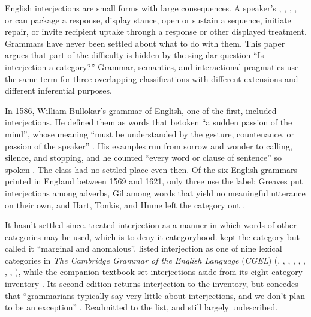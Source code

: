\documentclass[12pt]{article}
\begin{document}
English interjections are small forms with large consequences. A
speaker's , , , , or
 can package a response, display stance, open or sustain a
sequence, initiate repair, or invite recipient uptake through a response or
other displayed treatment. Grammars have never been
settled about what to do with them. This paper argues that part of the
difficulty is hidden by the singular question \enquote{Is interjection a
category?} Grammar, semantics, and interactional pragmatics use the same term
for three overlapping classifications with different extensions and
different inferential purposes.

In 1586, William Bullokar's grammar of English, one of the first,
included interjections. He defined them as words that betoken
\enquote{a sudden passion of the mind}, whose meaning \enquote{must be
understanded by the gesture, countenance, or passion of the speaker}
\citep[373]{bullokar1586}. His examples run from sorrow and wonder to
calling, silence, and stopping, and he counted
\enquote{every word or clause of sentence} so spoken
\citep[350]{bullokar1586}. The class had no settled place even then. Of
the six English grammars printed in England between 1569 and 1621, only
three use the label: Greaves put interjections among adverbs, Gil among
words that yield no meaningful utterance on their own, and Hart, Tonkis,
and Hume left the category out \citep[483--485]{bagli2026}.

It hasn't settled since.
\textcite[90]{jespersen1924} treated interjection as a manner in which
words of other categories may be used, which is to deny it categoryhood.
\textcite[67]{quirk1985} kept the category but called it
\enquote{marginal and anomalous}.
\textcite[22]{HuddlestonPullum2002} listed interjection as one of nine
lexical categories in \textit{The Cambridge Grammar of the English
Language} (\textit{CGEL}) (,
, , , ,
, , , ), while the
companion textbook set interjections aside from its eight-category
inventory \citep[16]{HuddlestonPullum2005}. Its second
edition returns interjection to the inventory, but concedes that
\enquote{grammarians typically say very little about interjections, and
we don't plan to be an exception} \citep[24]{HuddlestonPullumReynolds2022}.
Readmitted to the list, and still largely undescribed.
\end{document}
